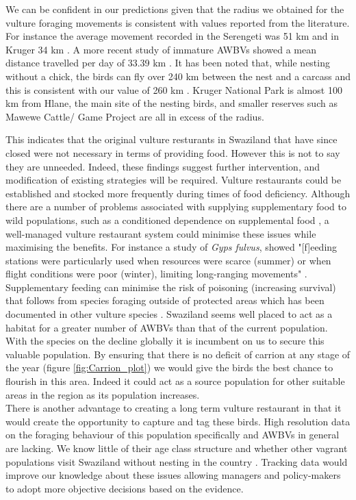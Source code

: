 We can be confident in our predictions given that the radius we obtained for the vulture foraging movements is consistent with values reported from the literature. For instance the average movement recorded in the Serengeti was 51 km and in Kruger 34 km \citep{mundy1992vultures}. A more recent study of immature AWBVs showed a mean distance travelled per day of 33.39 km \citep{phipps2013foraging}. It has been noted that, while nesting without a chick, the birds can fly over 240 km between the nest and a carcass and this is consistent with our value of 260 km \citep{houston1975digestive}. Kruger National Park is almost 100 km from Hlane, the main site of the nesting birds, and smaller reserves such as Mawewe Cattle/ Game Project are all in excess of the radius. 
\indent
 
 This indicates that the original vulture resturants in Swaziland that have since closed were not necessary in terms of providing food. However this is not to say they are unneeded. Indeed, these findings suggest further intervention, and modification of existing strategies will be required. Vulture restaurants could be established and stocked more frequently during times of food deficiency. Although there are a number of problems associated with supplying supplementary food to wild populations, such as a conditioned dependence on supplemental food \citep{robb2008food}, a well-managed vulture restaurant system could minimise these issues while maximising the benefits. For instance a study of \textit{Gyps fulvus}, showed "[f]eeding stations were particularly used when resources were scarce (summer) or when flight conditions were poor (winter), limiting long-ranging movements" \citep{monsarrat2013predictability}. Supplementary feeding can minimise the risk of poisoning (increasing survival) that follows from species foraging outside of protected areas which has been documented in other vulture species \citep{oro2008testing}. 
Swaziland seems well placed to act as a habitat for a greater number of AWBVs than that of the current population. With the species on the decline globally it is incumbent on us to secure this valuable population. By ensuring that there is no deficit of carrion at any stage of the year (figure \ref{fig:Carrion_plot}) we would give the birds the best chance to flourish in this area. Indeed it could act as a source population for other suitable areas in the region as its population increases. \\
\indent
There is another advantage to creating a long term vulture restaurant in that it would create the opportunity to capture and tag these birds. High resolution data on the foraging behaviour of this population specifically and AWBVs in general are lacking. We know little of their age class structure and whether other vagrant populations visit Swaziland without nesting in the country \citep{monadjem2003threatened}. Tracking data would improve our knowledge about these issues allowing managers and policy-makers to adopt more objective decisions based on the evidence. 
